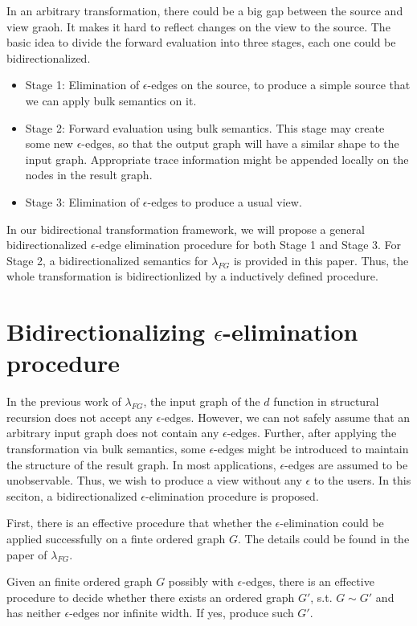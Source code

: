\documentclass{llncs}
\begin{document}
In an arbitrary transformation, there could be a big gap between the source and view graoh. It makes it hard to reflect changes on the view to the source. The basic idea to divide the forward evaluation into three stages, each one could be bidirectionalized.
\begin{itemize}
	\item Stage 1: Elimination of $\epsilon$-edges on the source, to produce a simple source that we can apply bulk semantics on it.
	\item Stage 2: Forward evaluation using bulk semantics. This stage may create some new $\epsilon$-edges, so that the output graph will have a similar shape to the input graph. Appropriate trace information might be appended locally on the nodes in the result graph.
	\item Stage 3: Elimination of $\epsilon$-edges to produce a usual view.
\end{itemize}

In our bidirectional transformation framework, we will propose a general bidirectionalized $\epsilon$-edge elimination procedure for both Stage 1 and Stage 3. For Stage 2, a bidirectionalized semantics for $\lambda_{FG}$ is provided in this paper. Thus, the whole transformation is bidirectionlized by a inductively defined procedure.

\section{Bidirectionalizing $\epsilon$-elimination procedure}\label{sec:eps}

In the previous work of $\lambda_{FG}$, the input graph of the $d$ function in structural recursion does not accept any $\epsilon$-edges. However, we can not safely assume that an arbitrary input graph does not contain any $\epsilon$-edges. Further, after applying the transformation via bulk semantics, some $\epsilon$-edges might be introduced to maintain the structure of the result graph. In most applications, $\epsilon$-edges are assumed to be unobservable. Thus, we wish to produce a view without any $\epsilon$ to the users. In this seciton, a bidirectionalized $\epsilon$-elimination procedure is proposed. 

First, there is an effective procedure that whether the $\epsilon$-elimination could be applied successfully on a finte ordered graph $G$. The details could be found in the paper of $\lambda_{FG}$.

\begin{lemma}\label{lamma:eps-exists}
Given an finite ordered graph $G$ possibly with $\epsilon$-edges, there is an effective procedure to decide whether there exists an ordered graph $G'$, s.t. $G\sim G'$ and has neither $\epsilon$-edges nor infinite width. If yes, produce such $G'$.
\end{lemma}
\end{document}
